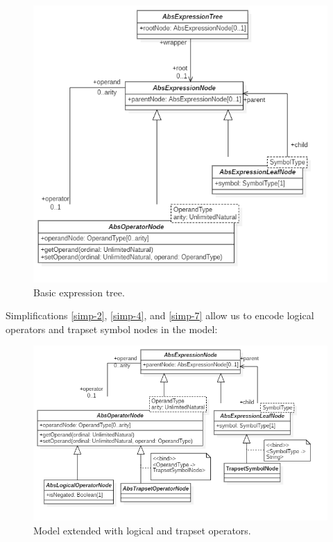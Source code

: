 \documentclass[12pt,oneside,a4paper,notitlepage]{report}
\begin{document}
	\begin{figure}[h]
		\begin{center}
			\includegraphics[width=\textwidth]
			{Models/BasicAbstractExpressionTree}
		\end{center}
		\caption{Basic expression tree.}
		\label{fig:basic-expr-tree}
	\end{figure}

	\newpage

	\par Simplifications \ref{simp-2}, \ref{simp-4}, and \ref{simp-7} allow us to encode logical operators and trapset symbol nodes in the model:

	\begin{figure}[h]
		\begin{center}
			\includegraphics[width=\textwidth]{Models/BasicConcreteExpressionTree}
		\end{center}
		\caption{Model extended with logical and trapset operators.}
		\label{fig:basic-concrete-expr-tree}
	\end{figure}
\end{document}

